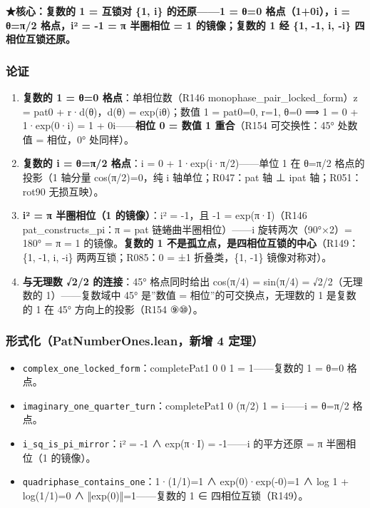 \documentclass[
]{article}
\providecommand{\tightlist}{%
  \setlength{\itemsep}{0pt}\setlength{\parskip}{0pt}}
\begin{document}
\textbf{★核心：复数的 1 = 互锁对 \{1, i\} 的还原------1 = θ=0
格点（1+0i），i = θ=π/2 格点，i² = -1 = π 半圈相位 = 1 的镜像；复数的 1
经 \{1, -1, i, -i\} 四相位互锁还原。}

\subsubsection{论证}\label{ux8bbaux8bc1-1}

\begin{enumerate}
\def\labelenumi{\arabic{enumi}.}
\tightlist
\item
  \textbf{复数的 1 = θ=0 格点}：单相位数（R146
  monophase\_pair\_locked\_form）z = pat0 + r·d(θ)，d(θ) = exp(iθ)；数值
  1 = pat0=0, r=1, θ=0 ⟹ 1 = 0 + 1·exp(0·i) = 1 + 0i------\textbf{相位 0
  = 数值 1 重合}（R154 可交换性：45° 处数值 = 相位，0° 处同样）。
\item
  \textbf{复数的 i = θ=π/2 格点}：i = 0 + 1·exp(i·π/2)------单位 1 在
  θ=π/2 格点的投影（1 轴分量 cos(π/2)=0，纯 i 轴单位；R047：pat 轴 ⊥
  ipat 轴；R051：rot90 无损互映）。
\item
  \textbf{i² = π 半圈相位（1 的镜像）}：i² = -1，且 -1 = exp(π·I)（R146
  pat\_constructs\_pi：π = pat 链蜷曲半圈相位）------i
  旋转两次（90°×2）= 180° = π = 1 的镜像。\textbf{复数的 1
  不是孤立点，是四相位互锁的中心}（R149：\{1, -1, i, -i\}
  两两互锁；R085：0 = ±1 折叠类，\{1, -1\} 镜像对称对）。
\item
  \textbf{与无理数 √2/2 的连接}：45° 格点同时给出 cos(π/4) = sin(π/4) =
  √2/2（无理数的 1）------复数域中 45° 是''数值 =
  相位''的可交换点，无理数的 1 是复数的 1 在 45° 方向上的投影（R154
  ⑨⑩）。
\end{enumerate}

\subsubsection{形式化（PatNumberOnes.lean，新增 4
定理）}\label{ux5f62ux5f0fux5316patnumberones.leanux65b0ux589e-4-ux5b9aux7406}

\begin{itemize}
\tightlist
\item
  \texttt{complex\_one\_locked\_form}：completePat1 0 0 1 =
  1------复数的 1 = θ=0 格点。
\item
  \texttt{imaginary\_one\_quarter\_turn}：completePat1 0 (π/2) 1 =
  i------i = θ=π/2 格点。
\item
  \texttt{i\_sq\_is\_pi\_mirror}：i² = -1 ∧ exp(π·I) = -1------i
  的平方还原 = π 半圈相位（1 的镜像）。
\item
  \texttt{quadriphase\_contains\_one}：1·(1/1)=1 ∧ exp(0)·exp(-0)=1 ∧
  log 1 + log(1/1)=0 ∧ ‖exp(0)‖=1------复数的 1 ∈ 四相位互锁（R149）。
\end{itemize}
\end{document}
